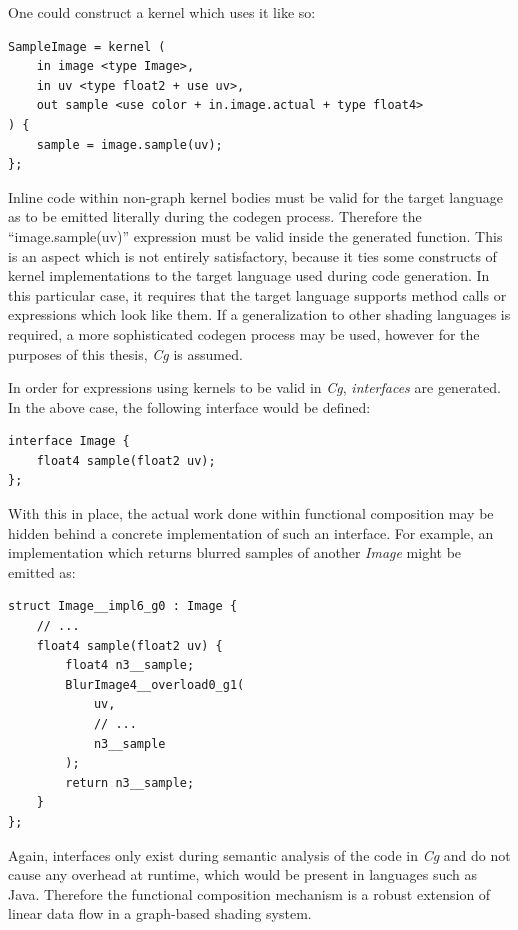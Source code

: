 One could construct a kernel which uses it like so:

\noindent\begin{minipage}{\textwidth}
\begin{lstlisting}[frame=single]
SampleImage = kernel (
	in image <type Image>,
	in uv <type float2 + use uv>,
	out sample <use color + in.image.actual + type float4>
) {
	sample = image.sample(uv);
};
\end{lstlisting}
\end{minipage}

Inline code within non-graph kernel bodies must be valid for the target language as to be emitted literally during the codegen process. Therefore the ``image.sample(uv)'' expression must be valid inside the generated function. This is an aspect which is not entirely satisfactory, because it ties some constructs of kernel implementations to the target language used during code generation. In this particular case, it requires that the target language supports method calls or expressions which look like them. If a generalization to other shading languages is required, a more sophisticated codegen process may be used, however for the purposes of this thesis, \emph{Cg} is assumed.

In order for expressions using kernels to be valid in \emph{Cg}, \emph{interfaces} are generated. In the above case, the following interface would be defined:

\noindent\begin{minipage}{\textwidth}
\begin{lstlisting}[frame=single]
interface Image {
	float4 sample(float2 uv);
};
\end{lstlisting}
\end{minipage}

With this in place, the actual work done within functional composition may be hidden behind a concrete implementation of such an interface. For example, an implementation which returns blurred samples of another \emph{Image} might be emitted as:

\noindent\begin{minipage}{\textwidth}
\begin{lstlisting}[frame=single]
struct Image__impl6_g0 : Image {
	// ...
	float4 sample(float2 uv) {
		float4 n3__sample;
		BlurImage4__overload0_g1(
			uv,
			// ...
			n3__sample
		);
		return n3__sample;
	}
};
\end{lstlisting}
\end{minipage}

Again, interfaces only exist during semantic analysis of the code in \emph{Cg} and do not cause any overhead at runtime, which would be present in languages such as Java. Therefore the functional composition mechanism is a robust extension of linear data flow in a graph-based shading system.
